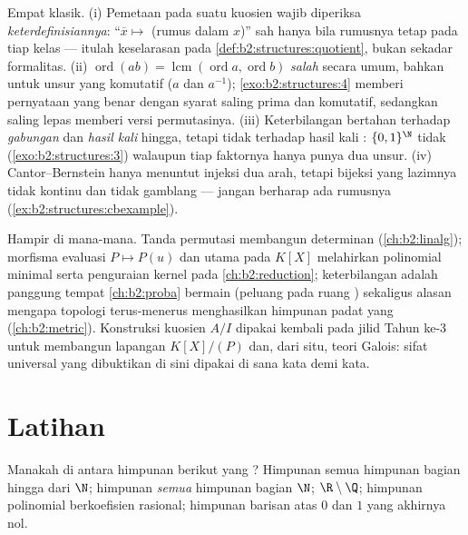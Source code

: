 \begin{remark}\label{rem:b2:structures:pitfalls}
Empat klasik. (i) Pemetaan pada suatu kuosien wajib diperiksa
\emph{keterdefinisiannya}: ``$\overline x \mapsto$ (rumus dalam $x$)''
sah hanya bila rumusnya tetap pada tiap kelas --- itulah keselarasan
pada \cref{def:b2:structures:quotient}, bukan sekadar
formalitas. (ii) $\operatorname{ord}(ab) =
\operatorname{lcm}(\operatorname{ord}a, \operatorname{ord}b)$
\emph{salah} secara umum, bahkan untuk unsur yang komutatif ($a$
dan $a^{-1}$); \cref{exo:b2:structures:4} memberi pernyataan yang
benar dengan syarat saling prima dan komutatif, sedangkan  saling
lepas memberi versi permutasinya. (iii) Keterbilangan bertahan
terhadap \emph{gabungan}  dan \emph{hasil kali} hingga, tetapi
tidak terhadap hasil kali : $\{0,1\}^{\N}$ tidak 
(\cref{exo:b2:structures:3}) walaupun tiap faktornya hanya punya dua
unsur. (iv) Cantor--Bernstein hanya menuntut injeksi dua arah,
tetapi bijeksi yang  lazimnya tidak kontinu dan tidak
gamblang --- jangan berharap ada rumusnya
(\cref{ex:b2:structures:cbexample}).
\end{remark}

\begin{remark}
Hampir di mana-mana. Tanda permutasi membangun determinan
(\cref{ch:b2:linalg}); morfisma evaluasi $P \mapsto P(u)$
dan  utama pada $K[X]$ melahirkan polinomial minimal serta
penguraian kernel pada \cref{ch:b2:reduction}; keterbilangan
adalah panggung tempat \cref{ch:b2:proba} bermain (peluang pada ruang
) sekaligus alasan mengapa topologi terus-menerus menghasilkan
himpunan padat yang  (\cref{ch:b2:metric}). Konstruksi kuosien
$A/I$ dipakai kembali pada jilid Tahun ke-3 untuk membangun lapangan
$K[X]/(P)$ dan, dari situ, teori Galois: sifat universal yang dibuktikan
di sini dipakai di sana kata demi kata.
\end{remark}

\section{Latihan}

\begin{exercise}[$\star$]\label{exo:b2:structures:1}
Manakah di antara himpunan berikut yang ? Himpunan semua
himpunan bagian hingga dari $\N$; himpunan \emph{semua} himpunan bagian
$\N$; $\R \setminus \Q$; himpunan polinomial berkoefisien rasional;
himpunan barisan atas $0$ dan $1$ yang akhirnya nol.
\end{exercise}

